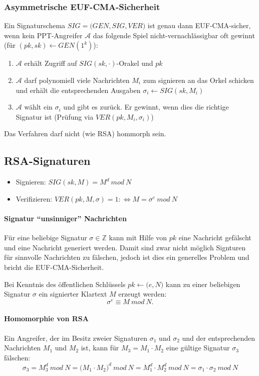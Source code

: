 \subsubsection{Asymmetrische EUF-CMA-Sicherheit}
Ein Signaturschema \(SIG = \big(GEN,SIG,VER\big)\) ist genau dann EUF-CMA-sicher, wenn kein PPT-Angreifer \(\mathcal{A}\) das folgende Spiel nicht-vernachlässigbar oft gewinnt (für \((pk,sk) \leftarrow GEN(1^k)\)):
\begin{enumerate}
	\item \(\mathcal{A}\) erhält Zugriff auf \(SIG(sk,\cdot)\)-Orakel und \(pk\)
	\item \(\mathcal{A}\) darf polynomiell viele Nachrichten \(M_i\) zum signieren an das Orkel schicken und erhält die entsprechenden Ausgaben \(\sigma_i \leftarrow SIG(sk,M_i)\)
	\item \(\mathcal{A}\) wählt ein \(\sigma_i\) und gibt es zurück. Er gewinnt, wenn dies die richtige Signatur ist (Prüfung via \(VER(pk,M_i,\sigma_i)\))
\end{enumerate}
Das Verfahren darf nicht (wie RSA) hommorph sein.


\subsection{RSA-Signaturen}
\begin{itemize}
	\item Signieren: \(SIG(sk,M) = M^d~mod~N\)
	\item Verifizieren: \(VER(pk,M,\sigma)=1 :\Leftrightarrow M = \sigma^e~mod~N\)
\end{itemize}

\paragraph{Signatur "`unsinniger"' Nachrichten}
Für eine beliebige Signatur \(\sigma \in \mathbb{Z}\) kann mit Hilfe von \(pk\) eine Nachricht gefälscht und eine Nachricht generiert werden. Damit sind zwar nicht möglich Signturen für sinnvolle Nachrichten zu fälschen, jedoch ist dies ein generelles Problem und bricht die EUF-CMA-Sicherheit.

Bei Kenntnis des öffentlichen Schlüssels \(pk \leftarrow \big(e,N\big)\) kann zu einer beliebigen Signatur \(\sigma\) ein signierter Klartext \(M\) erzeugt werden:
\[\sigma^e \equiv M~mod~N.\]

\paragraph{Homomorphie von RSA}
Ein Angreifer, der im Besitz zweier Signaturen \(\sigma_1\) und \(\sigma_2\) und der entsprechenden Nachrichten \(M_1\) und \(M_2\) ist, kann für \(M_3 = M_1 \cdot M_2\) eine gültige Signatur \(\sigma_3\) fälschen:
\[\sigma_3 = M^d_3~mod~N = \big(M_1 \cdot M_2\big)^d~mod~N = M_1^d \cdot M_2^d~mod~N = \sigma_1 \cdot \sigma_2~mod~N\]


